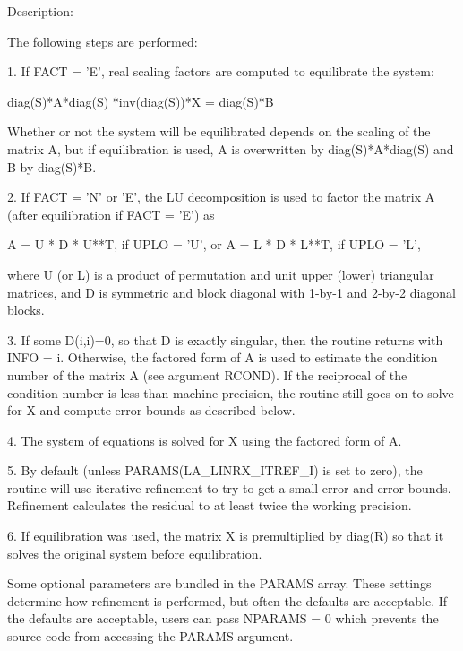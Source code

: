 \begin{DoxyParagraph}{Description\+: }
\begin{DoxyVerb}    The following steps are performed:

    1. If FACT = 'E', real scaling factors are computed to equilibrate
    the system:

      diag(S)*A*diag(S)     *inv(diag(S))*X = diag(S)*B

    Whether or not the system will be equilibrated depends on the
    scaling of the matrix A, but if equilibration is used, A is
    overwritten by diag(S)*A*diag(S) and B by diag(S)*B.

    2. If FACT = 'N' or 'E', the LU decomposition is used to factor
    the matrix A (after equilibration if FACT = 'E') as

       A = U * D * U**T,  if UPLO = 'U', or
       A = L * D * L**T,  if UPLO = 'L',

    where U (or L) is a product of permutation and unit upper (lower)
    triangular matrices, and D is symmetric and block diagonal with
    1-by-1 and 2-by-2 diagonal blocks.

    3. If some D(i,i)=0, so that D is exactly singular, then the
    routine returns with INFO = i. Otherwise, the factored form of A
    is used to estimate the condition number of the matrix A (see
    argument RCOND).  If the reciprocal of the condition number is
    less than machine precision, the routine still goes on to solve
    for X and compute error bounds as described below.

    4. The system of equations is solved for X using the factored form
    of A.

    5. By default (unless PARAMS(LA_LINRX_ITREF_I) is set to zero),
    the routine will use iterative refinement to try to get a small
    error and error bounds.  Refinement calculates the residual to at
    least twice the working precision.

    6. If equilibration was used, the matrix X is premultiplied by
    diag(R) so that it solves the original system before
    equilibration.\end{DoxyVerb}
 \begin{DoxyVerb}     Some optional parameters are bundled in the PARAMS array.  These
     settings determine how refinement is performed, but often the
     defaults are acceptable.  If the defaults are acceptable, users
     can pass NPARAMS = 0 which prevents the source code from accessing
     the PARAMS argument.\end{DoxyVerb}

\end{DoxyParagraph}


